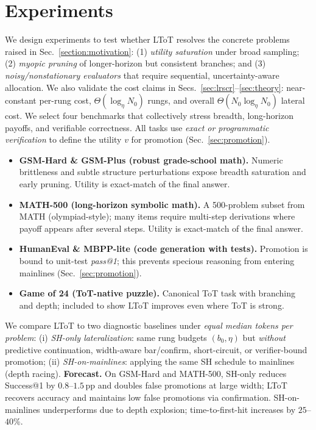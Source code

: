 \documentclass{article}
\begin{document}
\section{Experiments}
\label{section:experiments}

We design experiments to test whether LToT resolves the concrete problems raised in Sec.~\ref{section:motivation}:
(1) \emph{utility saturation} under broad sampling; (2) \emph{myopic pruning} of longer-horizon but consistent branches; and
(3) \emph{noisy/nonstationary evaluators} that require sequential, uncertainty-aware allocation.
We also validate the cost claims in Secs.~\ref{sec:lrscr}--\ref{sec:theory}:
near-constant per-rung cost, $\Theta(\log_\eta N_0)$ rungs, and overall $\Theta(N_0\log_\eta N_0)$ lateral cost.
We select four benchmarks that collectively stress breadth, long-horizon payoffs, and verifiable correctness.
All tasks use \emph{exact or programmatic verification} to define the utility $v$ for promotion (Sec.~\ref{sec:promotion}).

\begin{itemize}[leftmargin=*, itemsep=2pt, topsep=2pt]
    \item \textbf{GSM-Hard \& GSM-Plus (robust grade-school math).}
    Numeric brittleness and subtle structure perturbations expose breadth saturation and early pruning.
    Utility is exact-match of the final answer.
    \item \textbf{MATH-500 (long-horizon symbolic math).}
    A 500-problem subset from MATH (olympiad-style); many items require multi-step derivations where payoff appears after several steps.
    Utility is exact-match of the final answer.
    \item \textbf{HumanEval \& MBPP-lite (code generation with tests).}
    Promotion is bound to unit-test \emph{pass@1}; this prevents specious reasoning from entering mainlines (Sec.~\ref{sec:promotion}).
    \item \textbf{Game of 24 (ToT-native puzzle).}
    Canonical ToT task with branching and depth; included to show LToT improves even where ToT is strong.
\end{itemize}

We compare LToT to two diagnostic baselines under \emph{equal median tokens per problem}:
(i) \emph{SH-only lateralization}: same rung budgets $(b_0,\eta)$ but \emph{without} predictive continuation, width-aware bar/confirm, short-circuit, or verifier-bound promotion;
(ii) \emph{SH-on-mainlines}: applying the same SH schedule to mainlines (depth racing).
\textbf{Forecast.} On GSM-Hard and MATH-500, SH-only reduces Success@1 by $0.8$--$1.5$\,pp and doubles false promotions at large width;
LToT recovers accuracy and maintains low false promotions via confirmation. SH-on-mainlines underperforms due to depth explosion;
time-to-first-hit increases by $25$--$40$\%.
\end{document}
